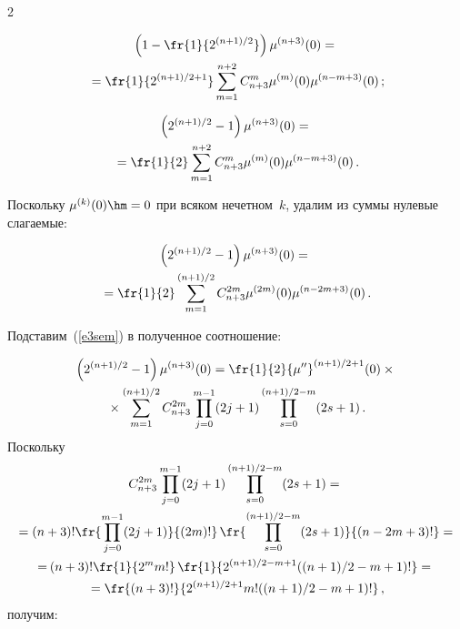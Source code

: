 \begin{multicols}{2}
{\begin{enumerate}[1.]
\vspace*{-13pt}

  \noindent
  \begin{multline*}
  \left( 1-\fr{1}{2^{(n+1)/2}}\right) \mu^{(n+3)}(0)={}\\
  {}=\fr{1}{2^{(n+1)/2+1}}  \sum\limits_{m=1}^{n+2} C^m_{n+3}\mu^{(m)}(0)\mu^{(n-m+3)}(0)\,;
  \end{multline*}
  
  \vspace*{-13pt}
  
  \noindent
  \begin{multline*}
  \left( 2^{(n+1)/2}-1\right) \mu^{(n+3)}(0)={}\\
  {}=\fr{1}{2}\sum\limits_{m=1}^{n+2} 
C^m_{n+3} \mu^{(m)}(0) \mu^{(n-m+3)}(0)\,.
  \end{multline*}
  
  Поскольку $\mu^{(k)}(0)\hm=0$ при всяком нечетном~$k$, удалим из суммы 
нулевые слагаемые:

\noindent
  \begin{multline*}
  \left( 2^{(n+1)/2}-1\right) \mu^{(n+3)}(0) ={}\\
  {}=\fr{1}{2}\sum\limits_{m=1}^{(n+1)/2} C_{n+3}^{2m} \mu^{(2m)}(0)\mu^{(n-
2m+3)}(0)\,.
  \end{multline*}
  
  Подставим~(\ref{e3sem}) в полученное соотношение:
  
  \noindent
  \begin{multline*}
  \left( 2^{(n+1)/2}-1\right) 
\mu^{(n+3)}(0)=
\fr{1}{2}{\mu^{\prime\prime}}^{(n+1)/2+1}(0) \times{}\\
{}\times
\sum\limits_{m=1}^{(n+1)/2} C^{2m}_{n+3} \prod\limits_{j=0}^{m-1} (2j+1) 
\prod\limits_{s=0}^{(n+1)/2-m} (2s+1)\,.
  \end{multline*}
  Поскольку 
  \begin{multline*}
  C^{2m}_{n+3} \prod\limits_{j=0}^{m-1}(2j+1) \prod\limits_{s=0}^{(n+1)/2-
m}(2s+1) ={}\\
{}= (n+3)!\fr{\prod\limits_{j=0}^{m-1}(2j+1)}{(2m)!}\, 
\fr{\prod_{s=0}^{(n+1)/2-m}(2s+1)}{(n-2m+3)!}= {}\\
\hspace*{-2.5pt}{}=\hspace*{-0.8pt}(n+3)! \fr{1}{2^m m!}\,\fr{1}{2^{(n+1)/2-m+1}((n+1)/2-m+1)!}={}\\
{}=\fr{(n+3)!}{2^{(n+1)/2+1} m!((n+1)/2-m+1)!}\,,
  \end{multline*}
  получим:
  

\end{enumerate}}
\end{multicols}
